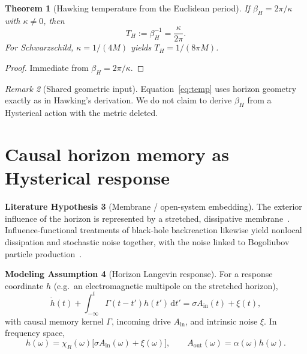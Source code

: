 \documentclass[11pt]{article}
\newtheorem{theorem}{Theorem}[section]
\theoremstyle{definition}
\newtheorem{model}[theorem]{Modeling Assumption}
\newtheorem{literaturehypothesis}[theorem]{Literature Hypothesis}
\theoremstyle{remark}
\newtheorem{remark}[theorem]{Remark}
\newcommand{\dd}{\mathrm{d}}
\begin{document}
\begin{theorem}[Hawking temperature from the Euclidean period]
\label{thm:temp}
If $\beta_H=2\pi/\kappa$ with $\kappa\neq0$, then
\begin{equation}
\label{eq:temp}
T_H:=\beta_H^{-1}=\frac{\kappa}{2\pi}.
\end{equation}
For Schwarzschild, $\kappa=1/(4M)$ yields $T_H=1/(8\pi M)$.
\end{theorem}

\begin{proof}
Immediate from $\beta_H=2\pi/\kappa$.
\end{proof}

\begin{remark}[Shared geometric input]
\label{rem:geom}
Equation~\eqref{eq:temp} uses horizon geometry exactly as in Hawking's derivation.
We do not claim to derive $\beta_H$ from a Hysterical action with the metric deleted.
\end{remark}

\section{Causal horizon memory as Hysterical response}
\label{sec:memory}
\begin{literaturehypothesis}[Membrane / open-system embedding]
\label{lit:membrane}
The exterior influence of the horizon is represented by a stretched, dissipative
membrane~\cite{Thorne1986,Parikh1999}.
Influence-functional treatments of black-hole backreaction likewise yield nonlocal
dissipation and stochastic noise together, with the noise linked to Bogoliubov
particle production~\cite{HuRavalSinha2002}.
\end{literaturehypothesis}

\begin{model}[Horizon Langevin response]
\label{mod:langevin}
For a response coordinate $h$ (e.g.\ an electromagnetic multipole on the stretched
horizon),
\begin{equation}
\label{eq:langevin}
\dot h(t)+\int_{-\infty}^{t}\Gamma(t-t')h(t')\,\dd t'
=\sigma A_{\mathrm{in}}(t)+\xi(t),
\end{equation}
with causal memory kernel $\Gamma$, incoming drive $A_{\mathrm{in}}$, and intrinsic
noise $\xi$.
In frequency space,
\begin{equation}
\label{eq:chi}
h(\omega)=\chi_R(\omega)\bigl[\sigma A_{\mathrm{in}}(\omega)+\xi(\omega)\bigr],
\qquad
A_{\mathrm{out}}(\omega)=\alpha(\omega)h(\omega).
\end{equation}
\end{model}
\end{document}
